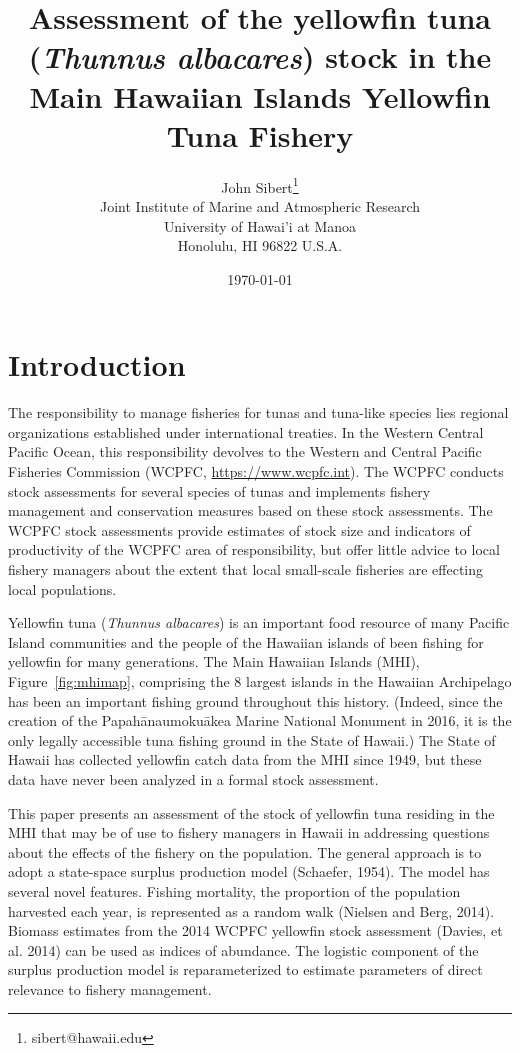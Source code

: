 \documentclass[12pt,letterpaper]{article}
\title{Assessment of the yellowfin tuna ({\it Thunnus albacares}) 
stock in the Main Hawaiian Islands Yellowfin Tuna Fishery}
\author{
John Sibert\thanks{sibert@hawaii.edu}\\
Joint Institute of Marine and Atmospheric Research\\
University of Hawai'i at Manoa\\
Honolulu, HI  96822 U.S.A.\\[0.125in]
\date{\today}
}
\newcommand\doublespacing{\baselineskip=1.6\normalbaselineskip}
\newcommand\help[1]{\color{Magenta}{\it #1}\normalcolor}
\begin{document}
\maketitle

\doublespacing

\begin{abstract}
\begin{center}\help{Write me!}\end{center}
\end{abstract}


\section*{Introduction}
The responsibility to manage fisheries for tunas and tuna-like species
lies regional organizations established under international treaties.
In the Western Central Pacific Ocean, this responsibility devolves to
the Western and Central Pacific Fisheries Commission (WCPFC, 
\url{https://www.wcpfc.int}).
The WCPFC conducts stock assessments for several species of tunas and
implements fishery management and conservation measures based on
these stock assessments. The WCPFC stock assessments provide estimates
of stock size and indicators of productivity of the WCPFC area of
responsibility, but offer little advice to local fishery managers about
the extent that local small-scale fisheries are effecting local
populations.

Yellowfin tuna ({\it Thunnus albacares}) is an important food resource
of many Pacific Island communities and the people of the Hawaiian
islands of been fishing for yellowfin for many generations. 
The Main Hawaiian Islands (MHI), Figure~\ref{fig:mhimap},
comprising the 8 largest islands in the Hawaiian Archipelago
has been an important fishing ground throughout this history.
(Indeed, since the creation of the Papah\={a}naumoku\={a}kea Marine National
Monument in 2016, it is the only legally accessible tuna fishing ground
in the State of Hawaii.)
The State of Hawaii has collected yellowfin catch data from the MHI
since 1949, but these data have never been analyzed in a formal stock
assessment.

This paper presents an assessment of the stock of yellowfin tuna
residing in the MHI that may be of use to fishery managers in Hawaii
in addressing questions about the effects of the fishery on the
population. The general approach is to adopt a state-space surplus
production model  (Schaefer, 1954). The model has several
novel features.
Fishing mortality, the proportion of the population harvested each
year, is represented as a random walk (Nielsen and Berg, 2014).
Biomass estimates from the 2014 WCPFC yellowfin stock assessment
(Davies, et al. 2014) can be used as indices of abundance.
The logistic component of the surplus production model is
reparameterized to estimate parameters of direct relevance to fishery
management.
\end{document}
